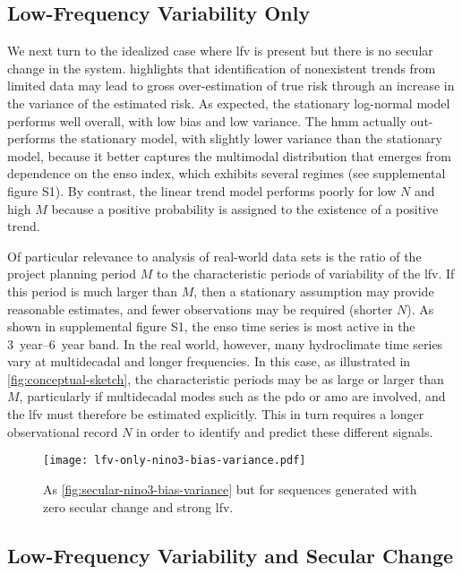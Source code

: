 \documentclass[
  draft,
  linenumbers
]{agujournal2019}
\begin{document}
\subsection{Low-Frequency Variability Only}

We next turn to the idealized case where  \gls{lfv} is present but there is no secular change in the system.
 highlights that identification of nonexistent trends from limited data may lead to gross over-estimation of true risk through an increase in the variance of the estimated risk.
As expected, the stationary log-normal model performs well overall, with low bias and low variance.
The \gls{hmm} actually out-performs the stationary model, with slightly lower variance than the stationary model, because it better captures the multimodal distribution that emerges from dependence on the \gls{enso} index, which exhibits several regimes (see supplemental figure S1).
By contrast, the linear trend model performs poorly for low $N$ and high $M$ because a positive probability is assigned to the existence of a positive trend.

Of particular relevance to analysis of real-world data sets is the ratio of the project planning period $M$ to the characteristic periods of variability of the \gls{lfv}.
If this period is much larger than $M$, then a stationary assumption may provide reasonable estimates, and fewer observations may be required (shorter $N$).
As shown in supplemental figure S1, the \gls{enso} time series is most active in the \SIrange{3}{6}{year} band.
In the real world, however, many hydroclimate time series vary at multidecadal and longer frequencies.
In this case, as illustrated in \cref{fig:conceptual-sketch}, the characteristic periods may be as large or larger than $M$, particularly if multidecadal modes such as the \gls{pdo} or \gls{amo} are involved, and the \gls{lfv} must therefore be estimated explicitly.
This in turn requires a longer observational record $N$ in order to identify and predict these different signals.

\begin{figure}
  \centering
  \texttt{[image: lfv-only-nino3-bias-variance.pdf]}
  \caption{
    As \cref{fig:secular-nino3-bias-variance} but for sequences generated with zero secular change and strong \gls{lfv}.
  }\label{fig:lfv-nino3-bias-variance}
\end{figure}

\subsection{Low-Frequency Variability and Secular Change}
\end{document}

